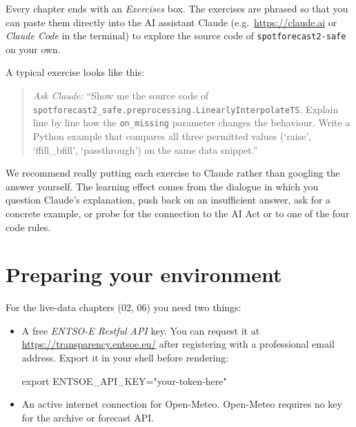 \documentclass[
  english,
  letterpaper,
]{scrbook}
\newenvironment{Shaded}{\begin{snugshade}}{\end{snugshade}}
\newcommand{\BuiltInTok}[1]{\textcolor[rgb]{0.00,0.23,0.31}{#1}}
\newcommand{\OperatorTok}[1]{\textcolor[rgb]{0.37,0.37,0.37}{#1}}
\newcommand{\StringTok}[1]{\textcolor[rgb]{0.13,0.47,0.30}{#1}}
\newcommand{\VariableTok}[1]{\textcolor[rgb]{0.07,0.07,0.07}{#1}}
\begin{document}

Every chapter ends with an \emph{Exercises} box. The exercises are
phrased so that you can paste them directly into the AI assistant Claude
(e.g.~\url{https://claude.ai} or \emph{Claude Code} in the terminal) to
explore the source code of \texttt{spotforecast2-safe} on your own.

A typical exercise looks like this:

\begin{quote}
\emph{Ask Claude:} ``Show me the source code of
\texttt{spotforecast2\_safe.preprocessing.LinearlyInterpolateTS}.
Explain line by line how the \texttt{on\_missing} parameter changes the
behaviour. Write a Python example that compares all three permitted
values (`raise', `ffill\_bfill', `passthrough') on the same data
snippet.''
\end{quote}

We recommend really putting each exercise to Claude rather than googling
the answer yourself. The learning effect comes from the dialogue in
which you question Claude's explanation, push back on an insufficient
answer, ask for a concrete example, or probe for the connection to the
AI Act or to one of the four code rules.

\section*{Preparing your environment}\label{preparing-your-environment}


For the live-data chapters (02, 06) you need two things:

\begin{itemize}
\item
  A free \emph{ENTSO-E Restful API} key. You can request it at
  \url{https://transparency.entsoe.eu/} after registering with a
  professional email address. Export it in your shell before rendering:

\begin{Shaded}
\begin{Highlighting}[]
\BuiltInTok{export} \VariableTok{ENTSOE\_API\_KEY}\OperatorTok{=}\StringTok{"your{-}token{-}here"}
\end{Highlighting}
\end{Shaded}
\item
  An active internet connection for Open-Meteo. Open-Meteo requires no
  key for the archive or forecast API.
\end{itemize}
\end{document}
